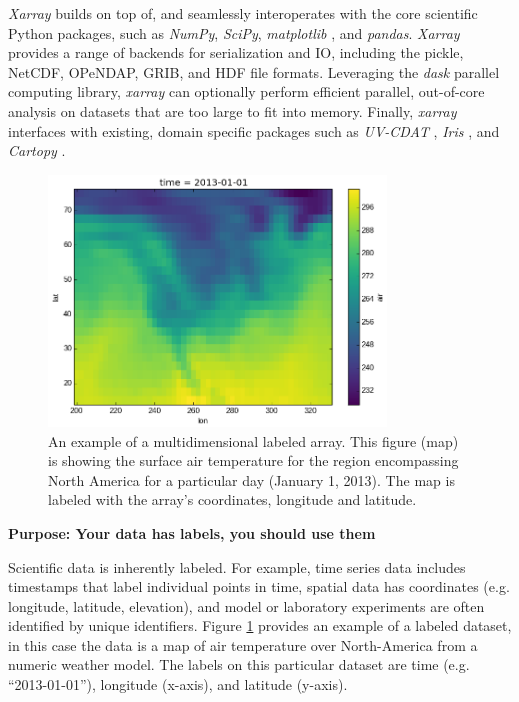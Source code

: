\documentclass{jors}
\begin{document}
\textit{Xarray} builds on top of, and seamlessly interoperates with the core scientific Python packages, such as \textit{NumPy}, \textit{SciPy}, \textit{matplotlib} \citep{Hunter_2007}, and \textit{pandas}.
\textit{Xarray} provides a range of backends for serialization and IO, including the pickle, NetCDF, OPeNDAP, GRIB, and HDF file formats.
Leveraging the \textit{dask} parallel computing library, \textit{xarray} can optionally perform efficient parallel, out-of-core analysis on datasets that are too large to fit into memory.
Finally, \textit{xarray} interfaces with existing, domain specific packages such as \textit{UV-CDAT} \citep{uvcdat}, \textit{Iris} \citep{Iris}, and \textit{Cartopy} \citep{Cartopy}.

\begin{figure}[h]
	\centering
	\includegraphics[width=0.8\textwidth]{plotting_kelvin_original}
	\caption{An example of a multidimensional labeled array. This figure (map) is showing the surface air temperature for the region encompassing North America for a particular day (January 1, 2013). The map is labeled with the array's coordinates, longitude and latitude.}
	\label{fig:temperature_map}
\end{figure}

\textbf{Purpose: Your data has labels, you should use them}

Scientific data is inherently labeled.
For example, time series data includes timestamps that label individual points in time, spatial data has coordinates (e.g. longitude, latitude, elevation), and model or laboratory experiments are often identified by unique identifiers.
Figure \ref{fig:temperature_map} provides an example of a labeled dataset, in this case the data is a map of air temperature over North-America from a numeric weather model.
The labels on this particular dataset are time (e.g. ``2013-01-01''), longitude (x-axis), and latitude (y-axis).
\end{document}

